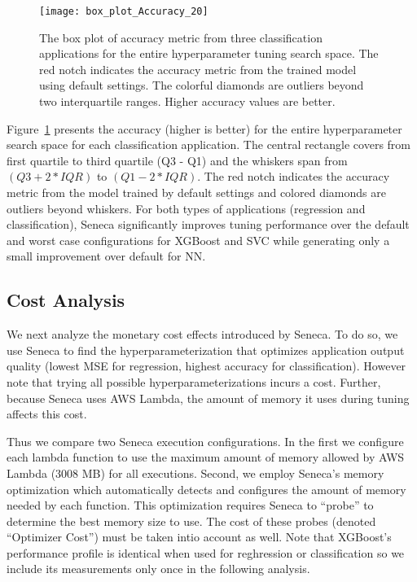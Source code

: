 \begin{figure}[t] \centering 
\texttt{[image: box\_plot\_Accuracy\_20]}
\vspace{-0.4in}
\caption{The box plot of accuracy metric from three classification applications for the entire hyperparameter tuning search space. The red notch indicates the accuracy metric from the trained model using default settings. The colorful diamonds are outliers beyond two interquartile ranges. Higher accuracy values are better.
\label{fig:box_plot_accuracy}}
\vspace{-0.1in}
\end{figure}

Figure~\ref{fig:box_plot_accuracy} presents the accuracy (higher is better) 
for the entire hyperparameter search space for each classification
application.  The central rectangle covers from first quartile to third quartile (Q3 - Q1) and the whiskers span from \texttt{$(Q3 + 2 * IQR)$} to \texttt{$(Q1 - 2 * IQR)$}. The red notch indicates the accuracy metric from the model trained by default settings and colored diamonds are outliers beyond whiskers.
For both types of applications (regression and classification), Seneca significantly
improves tuning performance over the default and worst case configurations for 
XGBoost and SVC while generating only a small improvement over default for NN.


\subsection{Cost Analysis}

We next analyze the monetary cost effects introduced by Seneca.  To do so, we
use Seneca to find the hyperparameterization that optimizes application output
quality (lowest MSE for regression, highest accuracy for classification).
However note that trying all possible hyperparameterizations incurs a cost.
Further, because Seneca uses AWS Lambda, the amount of memory it uses during
tuning affects this cost. 


Thus we compare two Seneca execution configurations.  In the first
we configure each lambda function to
use the maximum amount of memory allowed by AWS Lambda (3008 MB) for all
executions.
Second, we
employ Seneca's memory optimization which automatically detects and configures
the amount of memory needed by each function.  This optimization requires
Seneca to ``probe'' to determine the best memory size to use.  The
cost of these probes
(denoted ``Optimizer Cost'') must be taken intio account as well.
Note that XGBoost's performance profile is identical when used for reghression
or classification so we include its measurements only once in the following
analysis.

